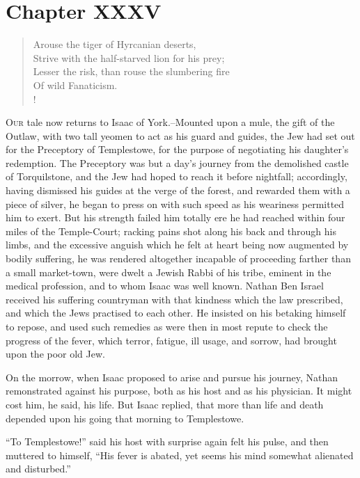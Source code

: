 \chapter{Chapter XXXV}

\begin{verse}
Arouse the tiger of Hyrcanian deserts,\\
Strive with the half-starved lion for his prey;\\
Lesser the risk, than rouse the slumbering fire\\
Of wild Fanaticism.\\!
\end{verse}

\lettrine{O}{ur} tale now returns to Isaac of York.--Mounted upon a mule,
the gift of
the Outlaw, with two tall yeomen to act as his guard and guides, the Jew
had set out for the Preceptory of Templestowe, for the purpose of
negotiating his daughter's redemption. The Preceptory was but a day's
journey from the demolished castle of Torquilstone, and the Jew had
hoped to reach it before nightfall; accordingly, having dismissed his
guides at the verge of the forest, and rewarded them with a piece of
silver, he began to press on with such speed as his weariness permitted
him to exert. But his strength failed him totally ere he had reached
within four miles of the Temple-Court; racking pains shot along his back
and through his limbs, and the excessive anguish which he felt at heart
being now augmented by bodily suffering, he was rendered altogether
incapable of proceeding farther than a small market-town, were dwelt a
Jewish Rabbi of his tribe, eminent in the medical profession, and to
whom Isaac was well known. Nathan Ben Israel received his suffering
countryman with that kindness which the law prescribed, and which the
Jews practised to each other. He insisted on his betaking himself to
repose, and used such remedies as were then in most repute to check the
progress of the fever, which terror, fatigue, ill usage, and sorrow, had
brought upon the poor old Jew.

On the morrow, when Isaac proposed to arise and pursue his journey,
Nathan remonstrated against his purpose, both as his host and as his
physician. It might cost him, he said, his life. But Isaac replied, that
more than life and death depended upon his going that morning to
Templestowe.

``To Templestowe!'' said his host with surprise again felt his pulse,
and then muttered to himself, ``His fever is abated, yet seems his mind
somewhat alienated and disturbed.''

